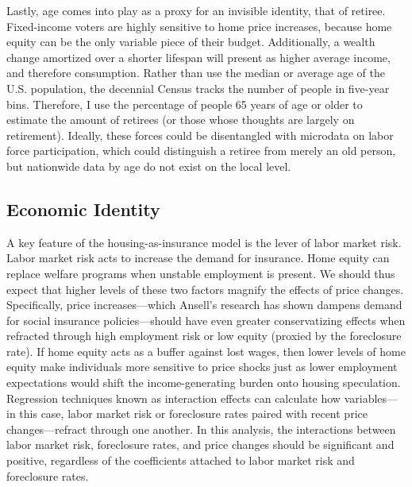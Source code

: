 \documentclass[12pt,oneside]{psthesis}
\begin{document}
Lastly, age comes into play as a proxy for an invisible identity, that of retiree.
Fixed-income voters are highly sensitive to home price increases, because home equity can be the only variable piece of their budget.
Additionally, a wealth change amortized over a shorter lifespan will present as higher average income, and therefore consumption.
Rather than use the median or average age of the U.S. population, the decennial Census tracks the number of people in five-year bins.
Therefore, I use the percentage of people 65 years of age or older to estimate the amount of retirees (or those whose thoughts are largely on retirement).
Ideally, these forces could be disentangled with microdata on labor force participation, which could distinguish a retiree from merely an old person, but nationwide data by age do not exist on the local level.

\hypertarget{economic-identity}{%
\subsection{Economic Identity}\label{economic-identity}}

A key feature of the housing-as-insurance model is the lever of labor market risk.
Labor market risk acts to increase the demand for insurance.
Home equity can replace welfare programs when unstable employment is present.
We should thus expect that higher levels of these two factors magnify the effects of price changes.
Specifically, price increases---which Ansell's research has shown dampens demand for social insurance policies---should have even greater conservatizing effects when refracted through high employment risk or low equity (proxied by the foreclosure rate).
If home equity acts as a buffer against lost wages, then lower levels of home equity make individuals more sensitive to price shocks just as lower employment expectations would shift the income-generating burden onto housing speculation.
Regression techniques known as interaction effects can calculate how variables---in this case, labor market risk or foreclosure rates paired with recent price changes---refract through one another.
In this analysis, the interactions between labor market risk, foreclosure rates, and price changes should be significant and positive, regardless of the coefficients attached to labor market risk and foreclosure rates.
\end{document}
